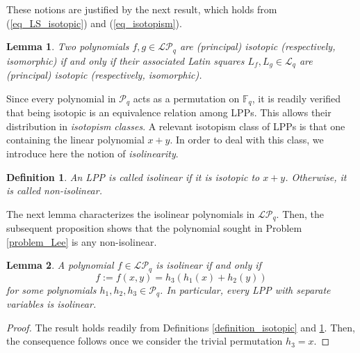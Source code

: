 \documentclass[pdflatex,sn-mathphys-num]{sn-jnl}
\theoremstyle{thmstyleone}%
\newtheorem{lemma}{Lemma}[section]
\newtheorem{definition}{Definition}[section]
\begin{document}
\vspace{0.5cm}

These notions are justified by the next result, which holds from (\ref{eq_LS_isotopic}) and (\ref{eq_isotopism}).

\begin{lemma}\label{lemma_isotopic} Two polynomials $f,g\in \mathcal{LP}_q$ are (principal) isotopic (respectively, isomorphic) if and only if their associated Latin squares $L_f, L_g\in \mathcal{L}_q$ are (principal) isotopic (respectively, isomorphic).  
\end{lemma}

\vspace{0.2cm}

Since every polynomial in $\mathcal{P}_q$ acts as a permutation on $\mathbb{F}_q$, it is readily verified that being isotopic is an equivalence relation among LPPs. This allows their distribution in {\em isotopism classes}. A relevant isotopism class of LPPs is that one containing the linear polynomial $x+y$. In order to deal with this class, we introduce here the notion of {\em isolinearity}.

\begin{definition}\label{definition_isolinear} An LPP  is called {\em isolinear} if it is isotopic to $x+y$. Otherwise, it is called {\em non-isolinear}.
\end{definition}

\vspace{0.2cm}

The next lemma characterizes the isolinear polynomials in $\mathcal{LP}_q$. Then, the subsequent proposition shows that the polynomial sought in Problem \ref{problem_Lee} is any non-isolinear.

\begin{lemma}\label{lemma_isotopic_23} A polynomial $f\in\mathcal{LP}_q$ is isolinear if and only if 
\[f:=f(x,y)=h_3(h_1(x)+h_2(y))\]
for some polynomials $h_1,h_2,h_3\in \mathcal{P}_q$. In particular, every LPP with separate variables is isolinear.
\end{lemma}

\begin{proof} The result holds readily from Definitions \ref{definition_isotopic} and \ref{definition_isolinear}. Then, the consequence follows once we consider the trivial permutation $h_3=x$.
\end{proof}

\vspace{0.2cm}
\end{document}
